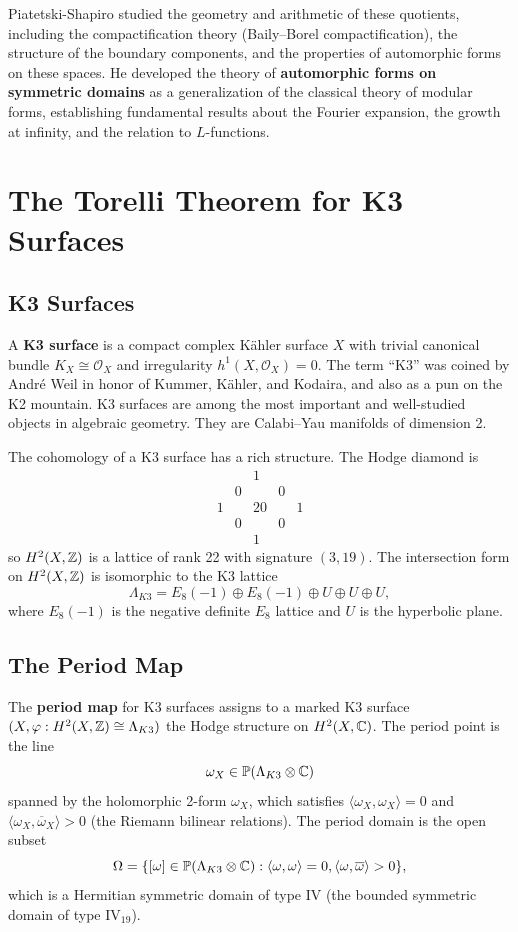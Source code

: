 Piatetski-Shapiro studied the geometry and arithmetic of these quotients, including the compactification theory (Baily--Borel compactification), the structure of the boundary components, and the properties of automorphic forms on these spaces. He developed the theory of \textbf{automorphic forms on symmetric domains} as a generalization of the classical theory of modular forms, establishing fundamental results about the Fourier expansion, the growth at infinity, and the relation to \(L\)-functions.

\section{The Torelli Theorem for K3 Surfaces}

\subsection{K3 Surfaces}

A \textbf{K3 surface} is a compact complex K\"{a}hler surface \(X\) with trivial canonical bundle \(K_X \cong \mathcal{O}_X\) and irregularity \(h^1(X,\mathcal{O}_X) = 0\). The term ``K3'' was coined by Andr\'{e} Weil in honor of Kummer, K\"{a}hler, and Kodaira, and also as a pun on the K2 mountain. K3 surfaces are among the most important and well-studied objects in algebraic geometry. They are Calabi--Yau manifolds of dimension 2.

The cohomology of a K3 surface has a rich structure. The Hodge diamond is
\[
\begin{array}{ccccc}
& & 1 & & \\
& 0 & & 0 & \\
1 & & 20 & & 1 \\
& 0 & & 0 & \\
& & 1 & & 
\end{array}
\]
so \(H^2(X,\mathbb{Z})\) is a lattice of rank 22 with signature \((3,19)\). The intersection form on \(H^2(X,\mathbb{Z})\) is isomorphic to the K3 lattice
\[
\Lambda_{K3} = E_8(-1) \oplus E_8(-1) \oplus U \oplus U \oplus U,
\]
where \(E_8(-1)\) is the negative definite \(E_8\) lattice and \(U\) is the hyperbolic plane.

\subsection{The Period Map}

The \textbf{period map} for K3 surfaces assigns to a marked K3 surface \((X, \varphi: H^2(X,\mathbb{Z}) \cong \Lambda_{K3})\) the Hodge structure on \(H^2(X,\mathbb{C})\). The period point is the line
\[
\omega_X \in \mathbb{P}(\Lambda_{K3} \otimes \mathbb{C})
\]
spanned by the holomorphic 2-form \(\omega_X\), which satisfies \(\langle \omega_X, \omega_X \rangle = 0\) and \(\langle \omega_X, \overline{\omega}_X \rangle > 0\) (the Riemann bilinear relations). The period domain is the open subset
\[
\Omega = \{ [\omega] \in \mathbb{P}(\Lambda_{K3} \otimes \mathbb{C}) : \langle \omega, \omega \rangle = 0, \langle \omega, \overline{\omega} \rangle > 0 \},
\]
which is a Hermitian symmetric domain of type IV (the bounded symmetric domain of type \(\mathrm{IV}_{19}\)).

